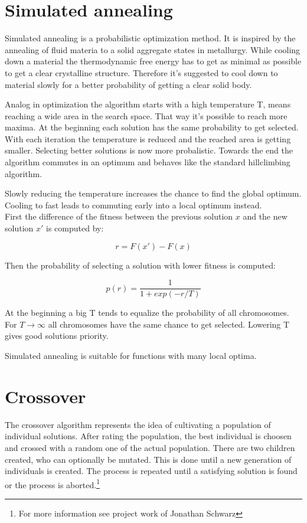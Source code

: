 \documentclass[10pt,a4paper,DIV=11]{scrreprt}
\begin{document}
\section{Simulated annealing}
Simulated annealing is a probabilistic optimization method.
It is inspired by the annealing of fluid materia to a solid aggregate states in metallurgy. While cooling down a material the thermodynamic free energy has to get as minimal as possible to get a clear crystalline structure. Therefore it's suggested to cool down to material slowly for a better probability of getting a clear solid body.

Analog in optimization the algorithm starts with a high temperature T, means reaching a wide area in the search space. That way it's possible to reach more maxima. At the beginning each solution has the same probability to get selected. With each iteration the temperature is reduced and the reached area is getting smaller. Selecting better solutions is now more probalistic.
Towards the end the algorithm commutes in an optimum and behaves like the standard hillclimbing algorithm.

Slowly reducing the temperature increases the chance to find the global optimum. Cooling to fast leads to commuting early into a local optimum instead. \\

First the difference of the fitness between the previous solution $x$ and the new solution $x'$ is computed by:

\begin{equation}
r = F(x') - F(x)
\end{equation} 

Then the probability of selecting a solution with lower fitness is computed:

\begin{equation}
p(r) = \frac{1}{1+exp(-r/T)}
\end{equation} 

At the beginning a big T tends to equalize the probability of all chromosomes. For $T \to \infty$ all chromosomes have the same chance to get selected. Lowering T gives good solutions priority.

Simulated annealing is suitable for functions with many local optima.

\section{Crossover}
The crossover algorithm represents the idea of cultivating a population of individual solutions. After rating the population, the best individual is choosen and crossed with a random one of the actual population. There are two children created, who can optionally be mutated. This is done until a new generation of individuals is created.
The process is repeated until a satisfying solution is found or the process is aborted.\footnote{For more information see project work of Jonathan Schwarz}
\end{document}
